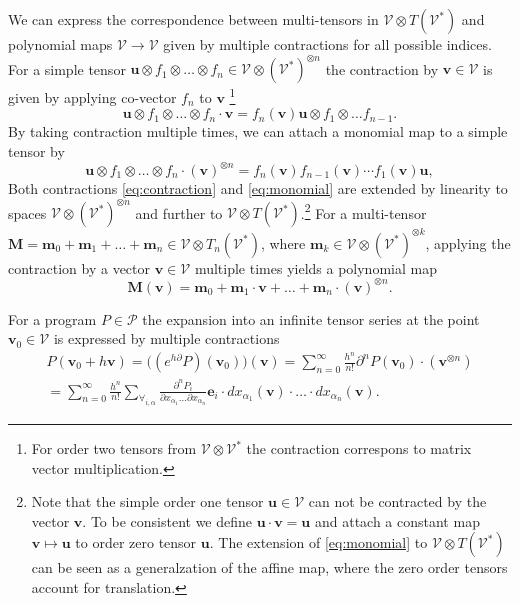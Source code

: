 \documentclass[11pt]{article}
\newcommand{\bfM}{\mathbf{M}}
\newcommand{\bfm}{\mathbf{m}}
\newcommand{\VV}{\mathcal{V}}
\newcommand{\e}{\mathbf{e}}
\newcommand{\uu}{\mathbf{u}}
\newcommand{\vv}{\mathbf{v}}
\newcommand{\dP}{\mathcal{P}}
\newcommand{\D}{\partial}
\begin{document}
 We can express the
 correspondence between multi-tensors in $\VV\otimes T(\VV^*)$ and polynomial maps
 $\VV\to \VV$ given by multiple contractions for all possible indices. For a simple tensor $\uu\otimes
 f_1\otimes\ldots\otimes f_n\in \VV\otimes(\VV^*)^{\otimes n}$ the contraction by
 $\vv\in \VV$ is given by applying co-vector $f_n$ to $\vv$ \footnote{For order
   two tensors from $\VV\otimes\VV^*$ the contraction correspons to
matrix vector multiplication.}
 \begin{equation}
   \label{eq:contraction}
 \uu\otimes f_1\otimes\ldots\otimes f_n\cdot \vv = f_n(\vv) \uu\otimes f_1\otimes\ldots f_{n-1}.
\end{equation}
By taking contraction multiple times, we can attach a monomial map to a
simple tensor by  
 \begin{equation}
   \label{eq:monomial}
 \uu\otimes f_1\otimes\ldots\otimes f_n\cdot (\vv)^{\otimes n} = f_n(\vv)f_{n-1}(\vv)\cdots f_1(\vv) \uu,
\end{equation}
Both contractions \eqref{eq:contraction} and \eqref{eq:monomial} are extended
by linearity to spaces $\VV\otimes \left(\VV^*\right)^{\otimes n}$ and further
to $\VV\otimes T(\VV^*)$.\footnote{Note that the simple order one tensor
  $\uu\in\VV$ can not be contracted by the vector $\vv$. To be consistent we
  define $\uu\cdot \vv = \uu$ and attach a constant map
  $\vv\mapsto \uu$ to order zero tensor $\uu$. The extension of
  \eqref{eq:monomial}
  to $\VV\otimes T(\VV^*)$ can be seen as a generalzation of the affine map,
  where the zero order tensors account for translation.}
For a multi-tensor $\bfM=\bfm_0+\bfm_1+\ldots+\bfm_n\in\VV\otimes T_n(\VV^*)$,
where $\bfm_k\in\VV\otimes\left( \VV^*\right)^{\otimes k}$, applying the
contraction by a vector $\vv\in \VV$ multiple times yields a polynomial map
\begin{equation}
  \label{eq:polynomial_tensor}
  \bfM(\vv) = \bfm_0+\bfm_1\cdot \vv+\ldots+\bfm_n\cdot (\vv)^{\otimes n}.
\end{equation}
\begin{theorem}\label{izr:e^d}
	For a program $P\in\dP$  the expansion into an infinite tensor series
  at the point $\vv_0\in \VV$ is expressed by multiple contractions 
	\begin{multline}\label{eq:tenzorVrsta}
	P(\vv_0+h\vv) = \Big((e^{h\D}P)(\vv_0)\Big)(\vv)
  = \sum_{n=0}^\infty\frac{h^n}{n!}\D^nP(\vv_0)\cdot (\vv^{\otimes n})\\
  = \sum_{n=0}^\infty \frac{h^n}{n!}\sum_{\forall_{i,\alpha}}\frac{\partial^nP_i}{\partial
 		    x_{\alpha_1}\ldots \partial x_{\alpha_n}}\e_i\cdot
 		  dx_{\alpha_1}(\vv)\cdot\ldots \cdot dx_{\alpha_n}(\vv).
	\end{multline}
\end{theorem}
 
\end{document}

